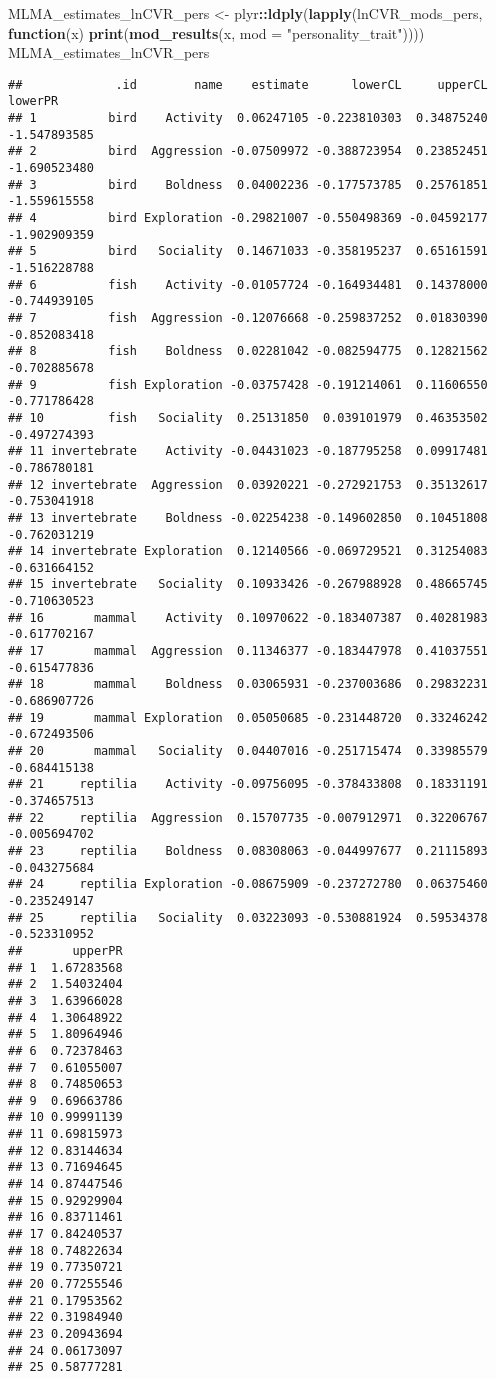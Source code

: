 \documentclass[]{article}
\newenvironment{Shaded}{\begin{snugshade}}{\end{snugshade}}
\newcommand{\KeywordTok}[1]{\textcolor[rgb]{0.13,0.29,0.53}{\textbf{#1}}}
\newcommand{\DataTypeTok}[1]{\textcolor[rgb]{0.13,0.29,0.53}{#1}}
\newcommand{\StringTok}[1]{\textcolor[rgb]{0.31,0.60,0.02}{#1}}
\newcommand{\ControlFlowTok}[1]{\textcolor[rgb]{0.13,0.29,0.53}{\textbf{#1}}}
\newcommand{\OperatorTok}[1]{\textcolor[rgb]{0.81,0.36,0.00}{\textbf{#1}}}
\newcommand{\NormalTok}[1]{#1}
\begin{document}
\begin{Shaded}
\begin{Highlighting}[]
\NormalTok{  MLMA_estimates_lnCVR_pers <-}\StringTok{ }\NormalTok{plyr}\OperatorTok{::}\KeywordTok{ldply}\NormalTok{(}\KeywordTok{lapply}\NormalTok{(lnCVR_mods_pers, }\ControlFlowTok{function}\NormalTok{(x) }\KeywordTok{print}\NormalTok{(}\KeywordTok{mod_results}\NormalTok{(x, }\DataTypeTok{mod =} \StringTok{"personality_trait"}\NormalTok{))))}
\NormalTok{      MLMA_estimates_lnCVR_pers}
\end{Highlighting}
\end{Shaded}

\begin{verbatim}
##             .id        name    estimate      lowerCL     upperCL      lowerPR
## 1          bird    Activity  0.06247105 -0.223810303  0.34875240 -1.547893585
## 2          bird  Aggression -0.07509972 -0.388723954  0.23852451 -1.690523480
## 3          bird    Boldness  0.04002236 -0.177573785  0.25761851 -1.559615558
## 4          bird Exploration -0.29821007 -0.550498369 -0.04592177 -1.902909359
## 5          bird   Sociality  0.14671033 -0.358195237  0.65161591 -1.516228788
## 6          fish    Activity -0.01057724 -0.164934481  0.14378000 -0.744939105
## 7          fish  Aggression -0.12076668 -0.259837252  0.01830390 -0.852083418
## 8          fish    Boldness  0.02281042 -0.082594775  0.12821562 -0.702885678
## 9          fish Exploration -0.03757428 -0.191214061  0.11606550 -0.771786428
## 10         fish   Sociality  0.25131850  0.039101979  0.46353502 -0.497274393
## 11 invertebrate    Activity -0.04431023 -0.187795258  0.09917481 -0.786780181
## 12 invertebrate  Aggression  0.03920221 -0.272921753  0.35132617 -0.753041918
## 13 invertebrate    Boldness -0.02254238 -0.149602850  0.10451808 -0.762031219
## 14 invertebrate Exploration  0.12140566 -0.069729521  0.31254083 -0.631664152
## 15 invertebrate   Sociality  0.10933426 -0.267988928  0.48665745 -0.710630523
## 16       mammal    Activity  0.10970622 -0.183407387  0.40281983 -0.617702167
## 17       mammal  Aggression  0.11346377 -0.183447978  0.41037551 -0.615477836
## 18       mammal    Boldness  0.03065931 -0.237003686  0.29832231 -0.686907726
## 19       mammal Exploration  0.05050685 -0.231448720  0.33246242 -0.672493506
## 20       mammal   Sociality  0.04407016 -0.251715474  0.33985579 -0.684415138
## 21     reptilia    Activity -0.09756095 -0.378433808  0.18331191 -0.374657513
## 22     reptilia  Aggression  0.15707735 -0.007912971  0.32206767 -0.005694702
## 23     reptilia    Boldness  0.08308063 -0.044997677  0.21115893 -0.043275684
## 24     reptilia Exploration -0.08675909 -0.237272780  0.06375460 -0.235249147
## 25     reptilia   Sociality  0.03223093 -0.530881924  0.59534378 -0.523310952
##       upperPR
## 1  1.67283568
## 2  1.54032404
## 3  1.63966028
## 4  1.30648922
## 5  1.80964946
## 6  0.72378463
## 7  0.61055007
## 8  0.74850653
## 9  0.69663786
## 10 0.99991139
## 11 0.69815973
## 12 0.83144634
## 13 0.71694645
## 14 0.87447546
## 15 0.92929904
## 16 0.83711461
## 17 0.84240537
## 18 0.74822634
## 19 0.77350721
## 20 0.77255546
## 21 0.17953562
## 22 0.31984940
## 23 0.20943694
## 24 0.06173097
## 25 0.58777281
\end{verbatim}
\end{document}
